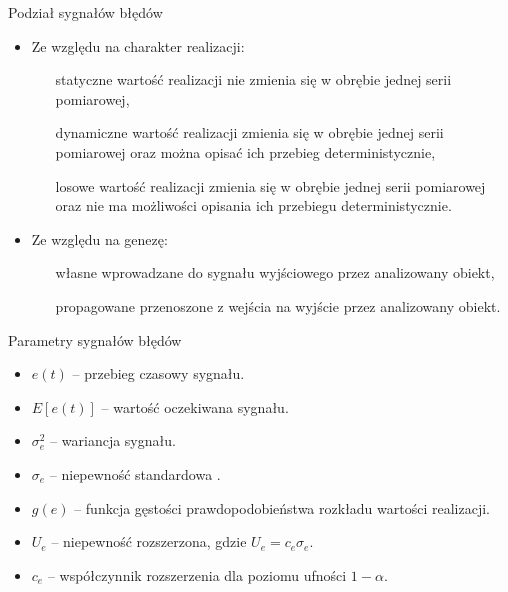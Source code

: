 \documentclass[12pt, polish, aspectratio = 169]{slides}
\begin{document}
\begin{frame}{Podział sygnałów błędów}
\begin{itemize}
\item Ze względu na charakter realizacji:
	\begin{itemize}
	\item[statyczne] wartość realizacji nie zmienia się w obrębie jednej serii pomiarowej,
	\item[dynamiczne] wartość realizacji zmienia się w obrębie jednej serii pomiarowej oraz można opisać ich przebieg deterministycznie,
	\item[losowe] wartość realizacji zmienia się w obrębie jednej serii pomiarowej oraz nie ma możliwości opisania ich przebiegu deterministycznie.
	\end{itemize}
\item Ze względu na genezę:
	\begin{itemize}
	\item [własne] wprowadzane do sygnału wyjściowego przez analizowany obiekt,
	\item [propagowane] przenoszone z wejścia na wyjście przez analizowany obiekt.
	\end{itemize}
\end{itemize}
\end{frame}

\begin{frame}{Parametry sygnałów błędów}
\begin{itemize}
\item $e(t)$ -- przebieg czasowy sygnału.
\item $E[e(t)]$ -- wartość oczekiwana sygnału.
\item $\sigma^{2}_{e}$ -- wariancja sygnału.
\item $\sigma_{e}$ -- niepewność standardowa .
\item $g(e)$ -- funkcja gęstości prawdopodobieństwa rozkładu wartości realizacji.
\item $U_{e}$ -- niepewność rozszerzona, gdzie $U_{e} = c_{e} \sigma_{e}$.
\item $c_{e}$ -- współczynnik rozszerzenia dla poziomu ufności $1 - \alpha$.
\end{itemize}
\end{frame}
\end{document}
